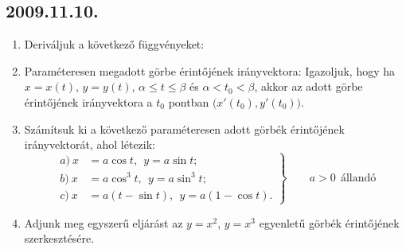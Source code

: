 \subsection*{2009.11.10.}
\begin{enumerate}
\item Deriváljuk a következő függvényeket:
\item Paraméteresen megadott görbe érintőjének irányvektora: Igazoljuk, hogy ha $x=x(t)$, 		$y=y(t)$, $\alpha \leq t \leq \beta$ és $\alpha <t_0 < \beta$, akkor az adott görbe 		érintőjének irányvektora a $t_0$ pontban $\Big(x'(t_0),y'(t_0)\Big)$.
\item Számítsuk ki a következő paraméteresen adott görbék érintőjének irányvektorát, ahol 		létezik: 
	\begin{equation}
 	\left.\begin{aligned}
	        a) ~x&= a \cos t,~~y=a \sin t; \\
	        b)~x&=a \cos^3 t,~~y=a \sin^3 t;\\
	        c)~x&=a(t-\sin t),~~y= a(1-\cos t).
	       \end{aligned}
	 \right\}
	 \qquad a>0~~ \text{állandó}
\end{equation}
\item Adjunk meg egyszerű eljárást az $y=x^2$, $y=x^3$ egyenletű görbék érintőjének szerkesztésére.
\end{enumerate}

